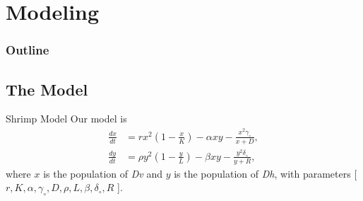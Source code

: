 
\section{Modeling}
\begin{frame}
  \frametitle{Outline}
  \tableofcontents[ currentsection ]
\end{frame}
\subsection{The Model}

\begin{frame}{Shrimp Model}
Our model is 
  \begin{align*}
    \frac{dx}{dt} & = rx^2 \left(1-\frac{x}{K}\right) - \alpha xy - \frac{x^2 \gamma_\circ}{x+D}, \\
    \frac{dy}{dt} & = \rho y^2 \left(1-\frac{y}{L}\right) - \beta xy -\frac{y^2 \delta_\circ}{y+R},
  \end{align*}
where $x$ is the population of \textit{Dv} and $y$ is the population of \textit{Dh}, with parameters [ $r, K, \alpha, \gamma_\circ, D, \rho, L, \beta, \delta_\circ, R$ ].
\end{frame}